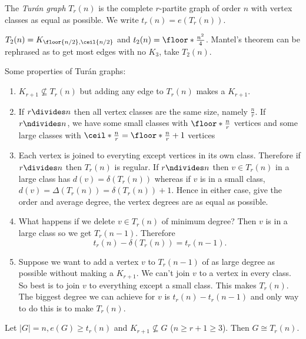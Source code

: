 \documentclass[a4paper]{article}
\begin{document}
\begin{definition}
  The \emph{Turán graph} \(T_r(n)\) is the complete \(r\)-partite graph of order \(n\) with vertex classes as equal as possible. We write \(t_r(n) = e(T_r(n))\).
\end{definition}

\begin{eg}
  \(T_2(n) = K_{\floor{n/2}, \ceil{n/2}}\) and \(t_2(n) = \floor*{\frac{n^2}{4}}\). Mantel's theorem can be rephrased as to get most edges with no \(K_3\), take \(T_2(n)\).
\end{eg}

Some properties of Turán graphs:
\begin{enumerate}
\item \(K_{r + 1} \nsubseteq T_r(n)\) but adding any edge to \(T_r(n)\) makes a \(K_{r + 1}\).
\item If \(r \divides n\) then all vertex classes are the same size, namely \(\frac{n}{r}\). If \(r \ndivides n\), we have some small classes with \(\floor*{\frac{n}{r}}\) vertices and some large classes with \(\ceil*{\frac{n}{r}} = \floor*{\frac{n}{r}} + 1\) vertices
\item Each vertex is joined to everyting except vertices in its own class. Therefore if \(r \divides n\) then \(T_r(n)\) is regular. If \(r \ndivides n\) then \(v \in T_r(n)\) in a large class has \(d(v) = \delta(T_r(n))\) whereas if \(v\) is in a small class, \(d(v) = \Delta(T_r(n)) = \delta(T_r(n)) + 1\). Hence in either case, give the order and average degree, the vertex degrees are as equal as possible.
\item What happens if we delete \(v \in T_r(n)\) of minimum degree? Then \(v\) is in a large class so we get \(T_r(n - 1)\). Therefore
  \[
    t_r(n) - \delta(T_r(n)) = t_r(n - 1).
  \]
\item Suppose we want to add a vertex \(v\) to \(T_r(n - 1)\) of as large degree as possible without making a \(K_{r + 1}\). We can't join \(v\) to a vertex in every class. So best is to join \(v\) to everything except a small class. This makes \(T_r(n)\). The biggest degree we can achieve for \(v\) is \(t_r(n) - t_r(n - 1)\) and only way to do this is to make \(T_r(n)\).
\end{enumerate}

\begin{theorem}[Turán]
  Let \(|G| = n, e(G) \geq t_r(n)\) and \(K_{r + 1} \nsubseteq G\) (\(n \geq r + 1 \geq 3\)). Then \(G \cong T_r(n)\).
\end{theorem}
\end{document}
